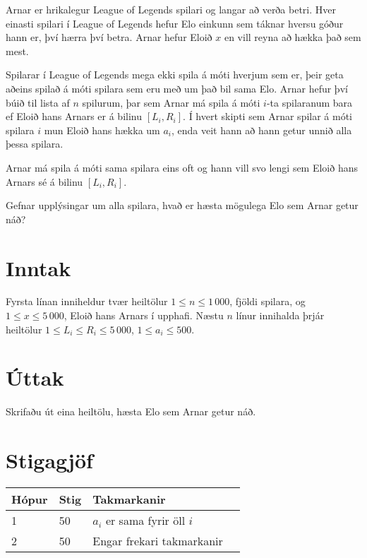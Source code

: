 Arnar er hrikalegur League of Legends spilari og langar að verða betri.
Hver einasti spilari í League of Legends hefur Elo einkunn sem táknar hversu góður hann er, því hærra því betra.
Arnar hefur Eloið $x$ en vill reyna að hækka það sem mest.

Spilarar í League of Legends mega ekki spila á móti hverjum sem er,
þeir geta aðeins spilað á móti spilara sem eru með um það bil sama Elo.
Arnar hefur því búið til lista af $n$ spilurum, þar sem Arnar má spila
á móti $i$-ta spilaranum bara ef Eloið hans Arnars er á bilinu $[L_i, R_i]$.
Í hvert skipti sem Arnar spilar á móti spilara $i$ mun Eloið hans hækka um
$a_i$, enda veit hann að hann getur unnið alla þessa spilara.

Arnar má spila á móti sama spilara eins oft og hann vill svo lengi sem Eloið hans Arnars sé á bilinu $[L_i,R_i]$.

Gefnar upplýsingar um alla spilara, hvað er hæsta mögulega Elo sem Arnar getur náð?

\section*{Inntak}
Fyrsta línan inniheldur tvær heiltölur $1 \le n \le 1\,000$, fjöldi spilara, og $1 \le x \le 5\,000$, Eloið hans Arnars í upphafi.
Næstu $n$ línur innihalda þrjár heiltölur $1 \le L_i \le R_i \le 5\,000$, $1 \le a_i \le 500$.

\section*{Úttak}
Skrifaðu út eina heiltölu, hæsta Elo sem Arnar getur náð.

\section*{Stigagjöf}
\begin{tabular}{|l|l|l|l|}
\hline
Hópur & Stig & Takmarkanir \\ \hline
1     & 50    & $a_i$ er sama fyrir öll $i$ \\ \hline
2     & 50    & Engar frekari takmarkanir \\ \hline
\end{tabular}

